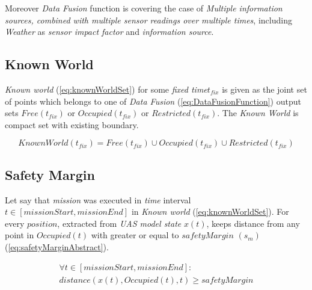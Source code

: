     
    \begin{note}
    Moreover \emph{Data Fusion} function is covering the case of \emph{Multiple information sources, combined with multiple sensor readings over multiple times}, including \emph{Weather} as \emph{sensor impact factor} and \emph{information source}. 
    \end{note}

\subsection{Known World}\label{s:KnownWorld}
   \noindent \emph{Known world} (\ref{eq:knownWorldSet}) for some \emph{fixed time}$t_{fix}$ is given as the joint set of points which belongs to one of \emph{Data Fusion} (\ref{eq:DataFusionFunction}) output sets $Free(t_{fix})$ or $Occupied(t_{fix})$ or $Restricted(t_{fix})$. The \emph{Known World} is compact set with existing boundary.
    
    \begin{equation}\label{eq:knownWorldSet}
        KnownWorld(t_{fix})= Free(t_{fix}) \cup Occupied(t_{fix}) \cup Restricted(t_{fix})
    \end{equation}



\subsection{Safety Margin}\label{s:SafetyMarginDefinition}
    \noindent Let say that \emph{mission} was executed in \emph{time} interval $t\in [missionStart,missionEnd]$ in \emph{Known world} (\ref{eq:knownWorldSet}). For every $position$, extracted from \emph{UAS model state} $x(t)$, keeps distance from any point in $Occupied(t)$  with greater or equal to $safetyMargin$ $(s_m)$ (\ref{eq:safetyMarginAbstract}).  
    
    \begin{multline}\label{eq:safetyMarginAbstract}
        \forall t\in [missionStart,missionEnd]:\\distance(x(t),Occupied(t),t) \ge safetyMargin
    \end{multline}

